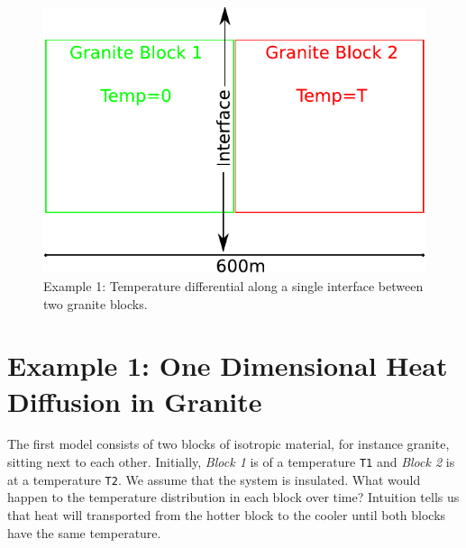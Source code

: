 
%
%
%

\begin{figure}[h!]
\centerline{\includegraphics[width=4.in]{figures/onedheatdiff001}}
\caption{Example 1: Temperature differential along a single interface between two granite blocks.}
\label{fig:onedgbmodel}
\end{figure}

\section{Example 1: One Dimensional Heat Diffusion in Granite}
\label{Sec:1DHDv00}

The first model consists of two blocks of isotropic material, for instance granite, sitting next to each other.
Initially, \textit{Block 1} is of a temperature
\verb|T1| and \textit{Block 2} is at a temperature \verb|T2|.
We assume that the system is insulated.
What would happen to the temperature distribution in each block over time? 
Intuition tells us that heat will transported from the hotter block to the cooler until both
blocks have the same temperature.

